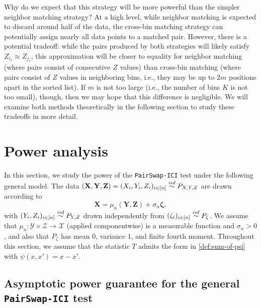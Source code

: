 \documentclass[12pt]{article}
\newcommand{\eps}{\varepsilon}
\newcommand{\iidsim}{\stackrel{\textnormal{iid}}{\sim}}
\newcommand{\Xcal}{\mathcal{X}}
\newcommand{\bX}{\mathbf{X}}
\newcommand{\bY}{\mathbf{Y}}
\newcommand{\bZ}{\mathbf{Z}}
\newcommand{\bzeta}{\mathbf{\eps}}
\def\bzeta{{\boldsymbol{\zeta}}}
\begin{document}
Why do we expect that this strategy will be more powerful than the simpler neighbor matching strategy? At a high level, while neighbor matching is expected to discard around half of the data, the cross-bin matching strategy can potentially assign nearly all data points to a matched pair. However, there is a potential tradeoff: while the pairs produced by both strategies will likely satisfy $Z_{i_\ell}\approx Z_{j_\ell}$,  this approximation will be closer to equality for neighbor matching (where pairs consist of consecutive $Z$ values) than cross-bin matching (where pairs consist of $Z$ values in neighboring bins, i.e., they may be up to $2m$ positions apart in the sorted list). If $m$ is not too large (i.e., the number of bins $K$ is not too small), though, then we may hope that this difference is negligible.
We will examine both methods theoretically in the following section to study these tradeoffs in more detail.



\section{Power analysis}\label{sec:power}

In this section, we study the power of the \textnormal{\texttt{PairSwap-ICI}} test under the following general model. The data $(\bX,\bY,\bZ) = (X_i,Y_i,Z_i)_{i\in [n]} \iidsim P_{X,Y,Z}$ are drawn according to
\begin{equation}\label{model:general alternative}
    \bX=\mu_n(\bY,\bZ)+\sigma_n\bzeta,
\end{equation}
with $(Y_i,Z_i)_{i\in [n]}\iidsim P_{Y,Z}$ drawn independently from $(\zeta_i)_{i\in [n]}\iidsim P_\zeta$. We assume that $\mu_n:\mathcal{Y} \times \mathcal{Z} \rightarrow \Xcal$ (applied componentwise) is a measurable function and $\sigma_n> 0$, and also that $P_\zeta$ has mean $0$, variance $1$, and finite fourth moment. Throughout this section,  
we assume that the statistic $T$ admits the form in \eqref{def:sum-of-psi} with $\psi(x,x') = x-x'$. 
 
\subsection{Asymptotic power guarantee for the general \texttt{PairSwap-ICI} test}\label{sec:power_general}
\end{document}
